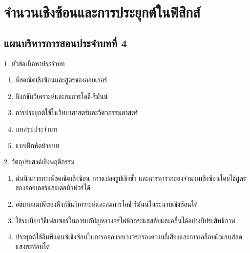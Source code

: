 \chapter{จำนวนเชิงซ้อนและการประยุกต์ในฟิสิกส์}

\section*{แผนบริหารการสอนประจำบทที่ 4}

\begin{planbox}[colframe=rbruNavy, colbacktitle=rbruNavy]{1. หัวข้อเนื้อหาประจำบท}
\begin{enumerate}[topsep=2pt, itemsep=1pt, partopsep=0pt, parsep=0pt, leftmargin=1.5em]
    \item พีชคณิตเชิงซ้อนและสูตรของออยเลอร์
    \item ฟังก์ชันวิเคราะห์และสมการโคชี-รีมันน์
    \item การประยุกต์ใช้ในวิทยาศาสตร์และวิศวกรรมศาสตร์
    \item บทสรุปประจำบท
    \item แบบฝึกหัดท้ายบท
\end{enumerate}
\end{planbox}

\begin{planbox}[colframe=rbruGreen, colbacktitle=rbruGreen]{2. วัตถุประสงค์เชิงพฤติกรรม}
\begin{enumerate}[topsep=2pt, itemsep=1pt, partopsep=0pt, parsep=0pt, leftmargin=1.5em]
    \item ดำเนินการทางพีชคณิตเชิงซ้อน การแปลงรูปเชิงขั้ว และการหารากของจำนวนเชิงซ้อนโดยใช้สูตรของออยเลอร์และเดอมัวฟวร์ได้
    \item อธิบายสมบัติของฟังก์ชันวิเคราะห์และสมการโคชี-รีมันน์ในระนาบเชิงซ้อนได้
    \item ใช้ระเบียบวิธีเฟสเซอร์ในการแก้ปัญหาวงจรไฟฟ้ากระแสสลับและคลื่นได้อย่างมีประสิทธิภาพ
    \item ประยุกต์ใช้อิมพีแดนซ์เชิงซ้อนในการออกแบบวงจรกรองความถี่เสียงและการเคลือบผิวเลนส์ลดแสงสะท้อนได้
\end{enumerate}
\end{planbox}

